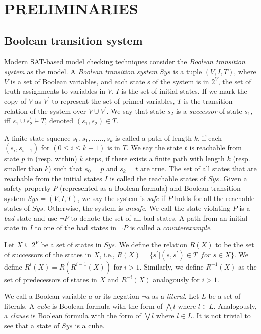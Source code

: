 \section{PRELIMINARIES}

\subsection{Boolean transition system}

Modern SAT-based model checking techniques consider the \emph{Boolean transition system} as the model. A \textit{Boolean transition system} $Sys$ is a tuple $(V,I,T)$, where $V$ is a set of Boolean variables, and each state s of the system is in $2^{V}$, the set of truth assignments to variables in $V$. $I$ is the set of initial states. If we mark the copy of $V$ as $V^{'}$ to represent the set of primed variables, $T$ is the transition relation of the system over $V \cup V^{'}$. We say that state $s_{2}$ is a \textit{successor} of state $s_{1}$, iff $s_{1} \cup s^{'}_{2} \models T$, denoted $(s_{1},s_{2}) \in T$.


A finite state squence $s_{0},s_{1},......,s_{k}$ is called a path of length $k$, if each $(s_{i},s_{i+1})$ for $(0 \leq i \leq k-1)$ is in $T$. We say the state $t$ is reachable from state $p$ in (resp. within) $k$ steps, if there exists a finite path with length $k$ (resp. smaller than $k$) such that $s_{0} = p$ and $s_{k} = t$ are true. The set of all states that are reachable from the initial states $I$ is called the reachable states of $Sys$.
Given a safety property $P$ (represented as a Boolean formula) and Boolean transition system $Sys = (V,I,T)$, we say the system is \emph{safe} if $P$ holds for all the reachable states of $Sys$. Otherwise, the system is \emph{unsafe}. We call the state violating $P$ is a \emph{bad} state and use $\neg P$ to denote the set of all bad states. A path from an initial state in $I$ to one of the bad states in $\neg P$ is called a \emph{counterexample}.

Let $X \subseteq 2^{V}$ be a set of states in $Sys$. We define the relation $R(X)$ to be the set of successors of the states in $X$, i.e.,  $R(X) = \lbrace s^{'}|(s,s^{'}) \in T\, \textit{ for }s \in X \rbrace$. We define $R^{i}(X) = R(R^{i-1}(X))$ for $i > 1$. Similarly, we define $R^{-1}(X)$ as the set of predecessors of states in $X$ and $R^{-i}(X)$ analogously for $i > 1$.

We call a Boolean variable $a$ or its negation $\neg a$ as a \emph{literal}.
Let $L$ be a set of literals. A \emph{cube} is Boolean formula with the form of $\bigwedge l$ where $l\in L$. Analogously, a \emph{clause} is Boolean formula with the form of $\bigvee l$ where $l\in L$. It is not trivial to see that a state of $Sys$ is a cube.

